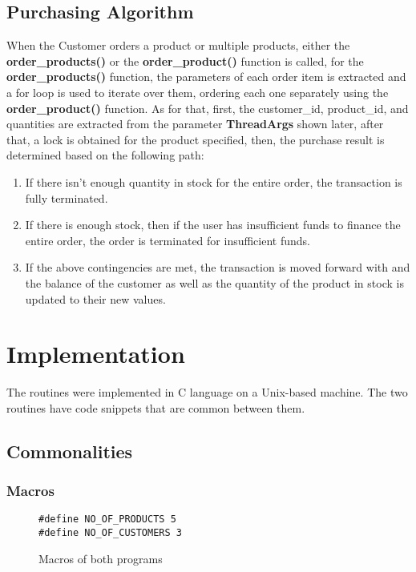 \documentclass[pdftex,12pt,a4paper]{article}
\begin{document}
\subsection{Purchasing Algorithm}
When the Customer orders a product or multiple products, either the \textbf{order\_products()} or the \textbf{order\_product()} function is called, for the \textbf{order\_products()} function, the parameters of each order item is extracted and a for loop is used to iterate over them, ordering each one separately using the \textbf{order\_product()} function. As for that, first, the customer\_id, product\_id, and quantities are extracted from the parameter \textbf{ThreadArgs} shown later, after that, a lock is obtained for the product specified, then, the purchase result is determined based on the following path:
\begin{enumerate}
\item If there isn't enough quantity in stock for the entire order, the transaction is fully terminated.
\item If there is enough stock, then if the user has insufficient funds to finance the entire order, the order is terminated for insufficient funds.
\item If the above contingencies are met, the transaction is moved forward with and the balance of the customer as well as the quantity of the product in stock is updated to their new values.
\end{enumerate}

\section{Implementation}
The routines were implemented in C language on a Unix-based machine.
The two routines have code snippets that are common between them.

\subsection{Commonalities}
\subsubsection{Macros}
\begin{figure}[H]
\centering
\begin{lstlisting}
#define NO_OF_PRODUCTS 5
#define NO_OF_CUSTOMERS 3
\end{lstlisting}
\label{fig:macros}
\caption{Macros of both programs}
\end{figure}
\end{document}
